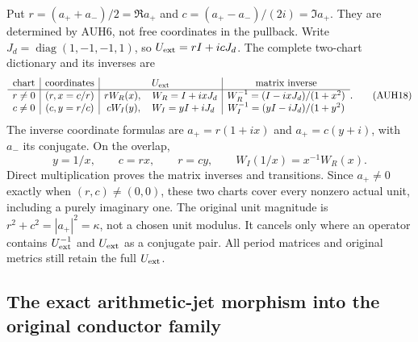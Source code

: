 Put $r=(a_++a_-)/2=\Re a_+$ and
$c=(a_+-a_-)/(2i)=\Im a_+$.
They are determined by AUH6, not free coordinates in the pullback.
Write $J_d=\operatorname{diag}(1,-1,-1,1)$, so
$U_{\rm ext}=rI+icJ_d$.
The complete two-chart dictionary and its inverses are
\[
\begin{array}{c|c|c|c}
 \text{chart}&\text{coordinates}&U_{\rm ext}&\text{matrix inverse}\\\hline
 r\ne0&(r,x=c/r)&rW_R(x),\quad W_R=I+ixJ_d&
 W_R^{-1}=(I-ixJ_d)/(1+x^2)\\
 c\ne0&(c,y=r/c)&cW_I(y),\quad W_I=yI+iJ_d&
 W_I^{-1}=(yI-iJ_d)/(1+y^2)
\end{array}.
 \tag{AUH18}
\]
The inverse coordinate formulas are $a_+=r(1+ix)$ and
$a_+=c(y+i)$, with $a_-$ its conjugate.
On the overlap,
\[
 y=1/x,\qquad c=rx,\qquad r=cy,\qquad
 W_I(1/x)=x^{-1}W_R(x).
 \tag{AUH19}
\]
Direct multiplication proves the matrix inverses and transitions.
Since $a_+\ne0$ exactly when $(r,c)\ne(0,0)$, these two charts
cover every nonzero actual unit, including a purely imaginary one.
The original unit magnitude is $r^2+c^2=|a_+|^2=\kappa$,
not a chosen unit modulus.  It cancels only where an operator
contains $U_{\rm ext}^{-1}$ and $U_{\rm ext}$ as a conjugate pair.
All period matrices and original metrics still retain the full
$U_{\rm ext}$.

\subsection{The exact arithmetic-jet morphism into the original conductor family}

